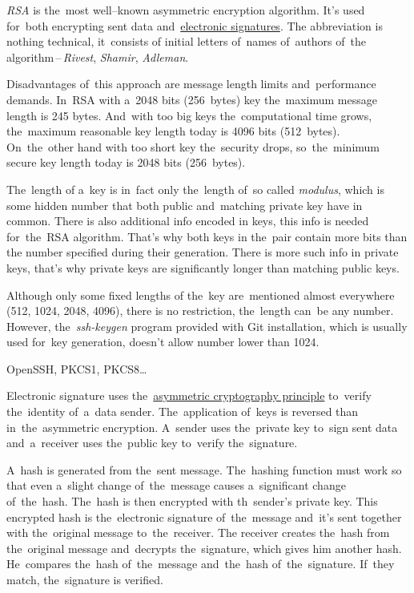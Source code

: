 \label{rsa}
\textit{RSA} is the~most well--known asymmetric encryption algorithm.
It's used for~both encrypting sent data and~\hyperref[electronicsignature]{electronic signatures}.
The abbreviation is nothing technical, it~consists of initial letters of~names of~authors of~the algorithm\,--\,\textit{Rivest}, \textit{Shamir}, \textit{Adleman}.

Disadvantages of~this approach are message length limits and~performance demands.
In~RSA with a~2048 bits (256~bytes) key the~maximum message length is 245 bytes.
And~with too big keys the~computational time grows, the~maximum reasonable key length today is 4096 bits (512~bytes).
On~the~other hand with too short key the~security drops, so~the~minimum secure key length today is 2048 bits (256~bytes).

The~length of a~key is in~fact only the~length of~so called \textit{modulus}, which is some hidden number that both public and~matching private key have in common.
There is also additional info encoded in keys, this info is needed for~the~RSA algorithm.
That's why both keys in the~pair contain more bits than the number specified during their generation.
There is more such info in private keys, that's why private keys are significantly longer than matching public keys.

\warning Although only some fixed lengths of the~key are~mentioned almost everywhere (512, 1024, 2048, 4096), there is no restriction, the~length can~be any number.
However, the~\textit{ssh-keygen} program provided with Git installation, which is usually used for~key generation, doesn't allow number lower than 1024.

\newline\todo OpenSSH, PKCS1, PKCS8\dots

\label{electronicsignature}
Electronic signature uses the~\hyperref[asymmetriccryptography]{asymmetric cryptography principle} to~verify the~identity of~a~data sender.
The~application of~keys is reversed than in~the~asymmetric encryption.
A~sender uses the~private key to~sign sent data and~a~receiver uses the~public key to~verify the~signature.

A~hash is generated from the~sent message.
The~hashing function must work so that even a~slight change of~the~message causes a~significant change of~the~hash.
The~hash is then encrypted with th~sender's private key.
This encrypted hash is the~electronic signature of~the~message and~it's sent together with the~original message to~the~receiver.
The receiver creates the~hash from the~original message and~decrypts the~signature, which gives him another hash.
He~compares the~hash of~the~message and~the~hash of~the~signature.
If~they match, the~signature is verified.

